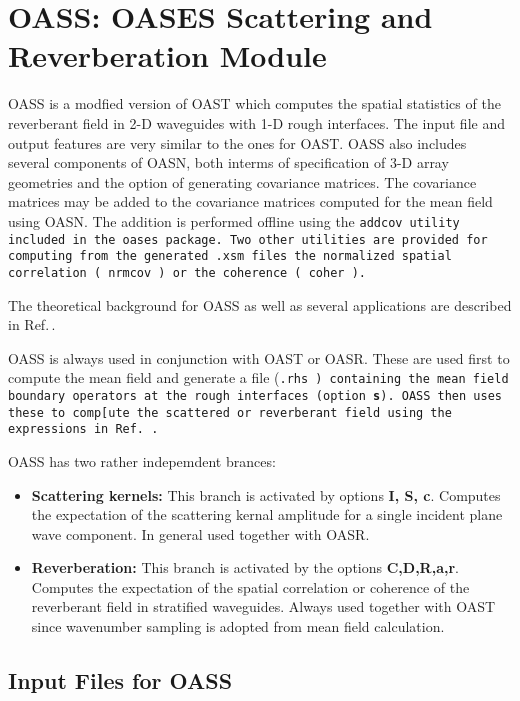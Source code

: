 \section{    OASS: OASES Scattering and Reverberation  Module}

OASS is a modfied version of OAST which computes the spatial statistics of the
reverberant field in 2-D waveguides with 1-D rough interfaces.   The
input file and output features are very similar to the ones for OAST.
OASS also includes several components of OASN, both interms of
specification of 3-D array geometries and the option of generating
covariance matrices. The covariance matrices may be added to the
covariance matrices computed for the mean field using OASN. The
addition is performed offline using the \tt addcov \rm utility
included in the oases package. Two other utilities are provided for
computing from the generated \tt .xsm \rm files the normalized spatial
correlation ( \tt nrmcov \rm ) or the coherence ( \tt coher \rm).

The theoretical background for OASS as well as several applications
are described in Ref.\,\cite{sk:rvb94}.

OASS is always used in conjunction with OAST or OASR. These are used
first to compute the mean field and generate a file (\tt .rhs \rm)
containing the mean field boundary operators at the rough interfaces 
(option {\bf s}). OASS then
uses these to comp[ute the scattered or reverberant field using the
expressions in Ref.\,\cite{sk:rvb94}. 

OASS has two rather indepemdent brances:
\begin{itemize}
\item {\bf Scattering kernels:} This branch is activated by options
{\bf I, S, c}. Computes the expectation of the scattering kernal
amplitude for a single incident plane wave component. In general used
together with OASR.
\item {\bf Reverberation:} This branch is activated by the options
{\bf C,D,R,a,r}. Computes the expectation of the spatial correlation
or coherence of the reverberant field in stratified waveguides. Always
used together with OAST since wavenumber sampling is adopted from mean
field calculation.
\end{itemize}

 \subsection{Input Files for OASS}

